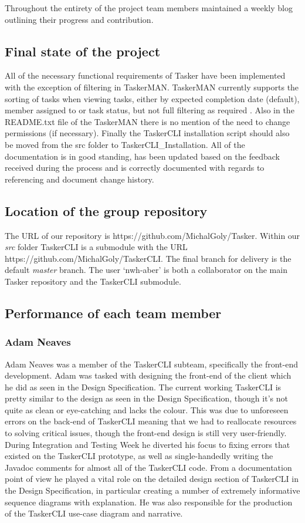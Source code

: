 \documentclass{project}
\begin{document}
Throughout the entirety of the project team members maintained a weekly blog outlining their progress and contribution.
\subsection{Final state of the project}
All of the necessary functional requirements of Tasker have been implemented with the exception of filtering in TaskerMAN. TaskerMAN currently supports the sorting of tasks when viewing tasks, either by expected completion date (default), member assigned to or task status, but not full filtering as required \cite{se.qa.rs}. Also in the README.txt file of the TaskerMAN there is no mention of the need to change permissions (if necessary). Finally the TaskerCLI installation script should also be moved from the src folder to TaskerCLI\_Installation. All of the documentation is in good standing, has been updated based on the feedback received during the process and is correctly documented with regards to referencing and document change history. 

\subsection{Location of the group repository}
The URL of our repository is https://github.com/MichalGoly/Tasker. Within our \textit{src} folder TaskerCLI is a submodule with the URL https://github.com/MichalGoly/TaskerCLI. The final branch for delivery is the default \textit{master} branch. The user `nwh-aber' is both a collaborator on the main Tasker repository and the TaskerCLI submodule.

\subsection{Performance of each team member}
\subsubsection{Adam Neaves}
Adam Neaves was a member of the TaskerCLI subteam, specifically the front-end development. Adam was tasked with designing the front-end of the client which he did as seen in the Design Specification\cite{se.qa.ds}. The current working TaskerCLI is pretty similar to the design as seen in the Design Specification, though it's not quite as clean or eye-catching and lacks the colour. This was due to unforeseen errors on the back-end of TaskerCLI meaning that we had to reallocate resources to solving critical issues, though the front-end design is still very user-friendly. During Integration and Testing Week he diverted his focus to fixing errors that existed on the TaskerCLI prototype, as well as single-handedly writing the Javadoc comments for almost all of the TaskerCLI code. From a documentation point of view he played a vital role on the detailed design section of TaskerCLI in the Design Specification, in particular creating a number of extremely informative sequence diagrams with explanation. He was also responsible for the production of the TaskerCLI use-case diagram and narrative.
\end{document}

